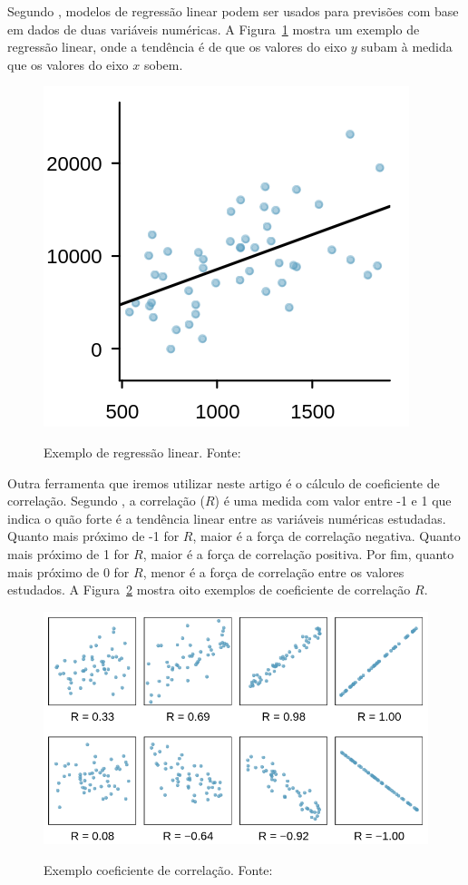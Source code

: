\documentclass[11.5pt]{article}
\begin{document}
Segundo \cite{openIntroStat}, modelos de regressão linear podem ser usados para previsões com base
em dados de duas variáveis numéricas. A Figura~\ref{fig:lin_reg_basic_example} mostra um exemplo de
regressão linear, onde a tendência é de que os valores do eixo $y$ subam à medida que os
valores do eixo $x$ sobem.

\begin{figure}[ht]
    \centering
    \includegraphics[width=.3\textwidth]{lin_reg_example.png}
    \label{fig:lin_reg_basic_example}
    \caption{Exemplo de regressão linear. Fonte: \cite{openIntroStat}}
\end{figure}

Outra ferramenta que iremos utilizar neste artigo é o cálculo de coeficiente de correlação.
Segundo \cite{openIntroStat}, a correlação ($R$) é uma medida com valor entre -1 e 1 que
indica o quão forte é a tendência linear entre as variáveis numéricas estudadas.
Quanto mais próximo de -1 for $R$, maior é a força de correlação negativa.
Quanto mais próximo de 1 for  $R$, maior é a força de correlação positiva.
Por fim, quanto mais próximo de 0 for $R$, menor é a força de correlação entre os valores
estudados. A Figura~\ref{fig:correlation_example} mostra oito exemplos de coeficiente de correlação
$R$.

\begin{figure}[ht]
    \centering
    \includegraphics[width=.7\textwidth]{correlation_example.png}
    \label{fig:correlation_example}
    \caption{Exemplo coeficiente de correlação. Fonte: \cite{openIntroStat}}
\end{figure}
\end{document}
